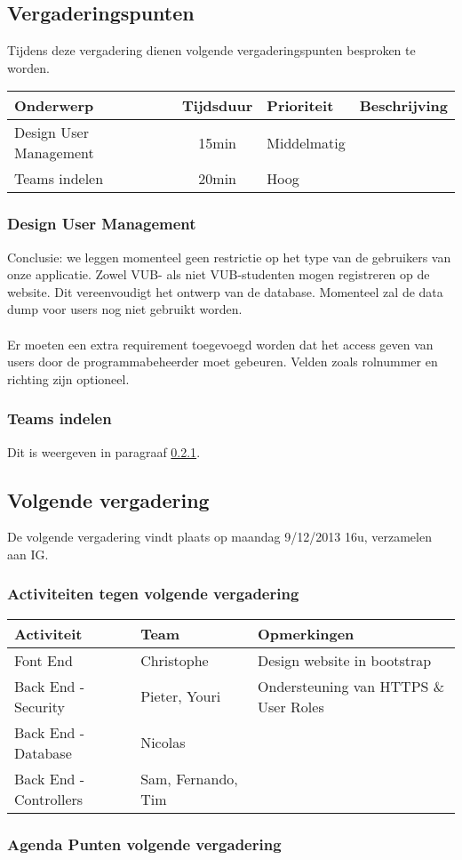 \subsection{Vergaderingspunten} \label{sec:VergaderingsPunten}

Tijdens deze vergadering dienen volgende vergaderingspunten besproken te worden.
\begin{table} [H]
	\centering
	\begin{tabular} {l|cll}
		\textbf{Onderwerp} & \textbf{Tijdsduur} & \textbf{Prioriteit} & \textbf{Beschrijving} \\ %
		\hline
		Design User Management & 15min & Middelmatig & \\
		Teams indelen & 20min & Hoog & \\
	\end{tabular}
\end{table}

\subsubsection{Design User Management}
Conclusie: we leggen momenteel geen restrictie op het type van de gebruikers van onze applicatie. Zowel VUB- als niet VUB-studenten mogen registreren op de website. Dit vereenvoudigt het ontwerp van de database. Momenteel zal de data dump voor users nog niet gebruikt worden.
\\
\\
Er moeten een extra requirement toegevoegd worden dat het access geven van users door de programmabeheerder moet gebeuren. Velden zoals rolnummer en richting zijn optioneel.

\subsubsection{Teams indelen}
Dit is weergeven in paragraaf \ref{sec:TODOActiviteiten}.


\subsection{Volgende vergadering}
De volgende vergadering vindt plaats op maandag 9/12/2013 16u, verzamelen aan IG.
\subsubsection{Activiteiten tegen volgende vergadering} \label{sec:TODOActiviteiten}
\begin{table} [H]
	\centering
	\begin{tabular} {l|l|l}
		\textbf{Activiteit} & \textbf{Team} & \textbf{Opmerkingen} \\
		\hline
		Font End & Christophe & Design website in bootstrap \\
		Back End - Security & Pieter, Youri & Ondersteuning van HTTPS \& User Roles \\
		Back End - Database & Nicolas & \\
		Back End - Controllers & Sam, Fernando, Tim \\
	\end{tabular}
\end{table}

\subsubsection{Agenda Punten volgende vergadering}


